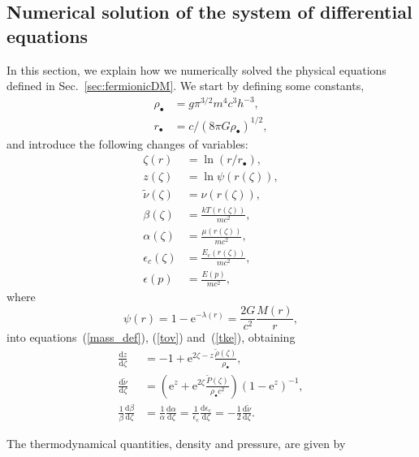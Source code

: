 \documentclass[twocolumn]{aa}
\begin{document}
\begin{appendix}
\section{Numerical solution of the system of differential equations}
\label{app:numerical}
In this section, we explain how we numerically solved the physical equations defined in Sec.~\ref{sec:fermionicDM}.
We start by defining some constants,
\begin{align}
    \rho_{\bullet}&= g\pi^{3/2} m^4 c^3 h^{-3},\\
    r_\bullet &= c/(8\pi G \rho_\bullet)^{1/2},
\end{align}
and introduce the following changes of variables:
\begin{align}
   \zeta(r) &= \ln(r/r_\bullet),\\
   z(\zeta) &=\ln\psi(r(\zeta)),\\
   \tilde{\nu}(\zeta) &=\nu(r(\zeta)),\\
   \beta(\zeta)&=\frac{kT(r(\zeta))}{mc^2},\\
   \alpha(\zeta)&=\frac{\mu(r(\zeta))}{mc^2},\\
   \epsilon_c(\zeta)&=\frac{E_c(r(\zeta))}{mc^2},\\
   \epsilon(p)&=\frac{E(p)}{mc^2},
\end{align}
where
\begin{equation}
    \psi(r) = 1-\textrm{e}^{-\lambda(r)} = \frac{2G}{c^2}\frac{M(r)}{r},
    \label{mass_dm}
\end{equation}
into equations~(\ref{mass_def}), (\ref{tov}) and~(\ref{tke}), obtaining
\begin{align}
   \label{sode}
   \frac{\mathrm{d}z}{\mathrm{d}\zeta} & = -1+\mathrm{e}^{2\zeta-z}\frac{\tilde{\rho}(\zeta)}{\rho_{\bullet}},\\
   \label{sode2}
   \frac{\mathrm{d}\tilde{\nu}}{\mathrm{d}\zeta} & = \left(\mathrm{e}^{z}+\mathrm{e}^{2\zeta}\frac{\tilde{P}(\zeta)}{\rho_{\bullet}c^2}\right)(1-\mathrm{e}^{z})^{-1},\\
   \frac{1}{\beta}\frac{\mathrm{d}\beta}{\mathrm{d}\zeta}&=\frac{1}{\alpha}\frac{\mathrm{d}\alpha}{\mathrm{d}\zeta}=
   \frac{1}{\epsilon_\mathrm{c}}\frac{\mathrm{d} \epsilon_\mathrm{c}}{\mathrm{d}\zeta}=-\frac{1}{2}\frac{\mathrm{d}\tilde{\nu}}{\mathrm{d}\zeta}.\label{tke2}
\end{align}


The thermodynamical quantities, density and pressure, are given by


\end{appendix}
\end{document}
